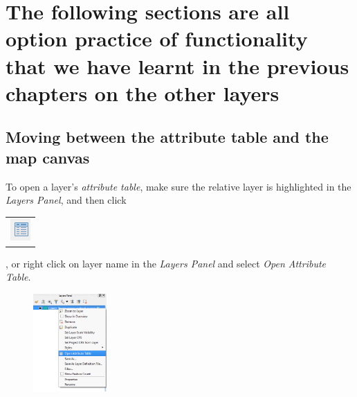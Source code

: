 

\section{The following sections are all option practice of functionality that we have learnt in the previous chapters on the other layers}




\subsection{Moving between the attribute table and the map canvas}

To open a layer's \textit{attribute table}, make sure the relative layer is highlighted in the \textit{Layers Panel}, and then click	\begin{tabular}{@{}c@{}}\includegraphics[width=4ex]{images/attribute_table_icon.png}\end{tabular}
, or right click on layer name in the \textit{Layers Panel} and select \textit{Open Attribute Table}.

\begin{figure}[!h]
	\centering
	\includegraphics[width=0.25\textwidth]{images/right_click_layername_cropped.png}
	\caption{}
	\label{ft_fig_firstfig3}
\end{figure}

